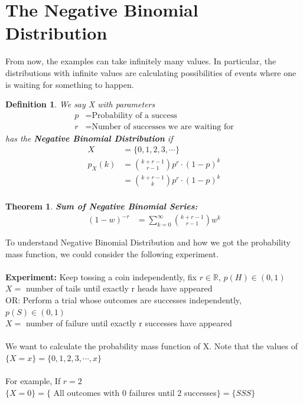 \documentclass[11pt,oneside]{book}
\theoremstyle{break}
\theoremstyle{break}
\newtheorem{thm}{Theorem}[section]
\newtheorem{defn}{Definition}[corL]
\begin{document}
\section[The Negative Binomial Distribution]{The Negative Binomial Distribution}
From now, the examples can take infinitely many values. In particular, the distributions with infinite values are calculating possibilities of events where one is waiting for something to happen.\begin{defn}
We say X with parameters\begin{align*}
p&=\text{Probability of a success}\\
r&=\text{Number of successes we are waiting for}
\end{align*}
 has the \textbf{Negative Binomial Distribution} if\begin{align*}
 X&=\{0,1,2,3,\cdots\}\\
 p_X(k)&=\binom{k+r-1}{r-1}p^r\cdot (1-p)^k\\
 &=\binom{k+r-1}{k}p^r\cdot (1-p)^k\\
 \end{align*}
\end{defn}
\begin{thm}
\textbf{Sum of Negative Binomial Series:}\begin{align*}
(1-w)^{-r}&=\sum_{k=0}^{\infty}\binom{k+r-1}{r-1}w^k
\end{align*}
\end{thm}
To understand Negative Binomial Distribution and  how we got the probability mass function, we could consider the following experiment.\\
\hfill\\
\textbf{Experiment:} Keep tossing a coin independently, fix $r\in \mathbb{R}$, $p(H)\in (0,1)$\\
\text{\qquad} \qquad \qquad $X=$ number of tails until exactly r heads have appeared\\
\text{\qquad} \qquad \qquad OR: Perform a trial whose outcomes are successes independently, $p(S)\in (0,1)$\\
\text{\qquad} \qquad \qquad $X=$ number of failure until exactly r successes have appeared\\
\hfill\\
We want to calculate the probability mass function of X. Note that the values of $\{X=x\}=\{0,1,2,3,\cdots,x\}$\\
\hfill\\
For example, If $r=2$\\
$\{X=0\}=\{$ All outcomes with 0 failures until 2 successes$\}=\{SSS\}$\\
\end{document}
